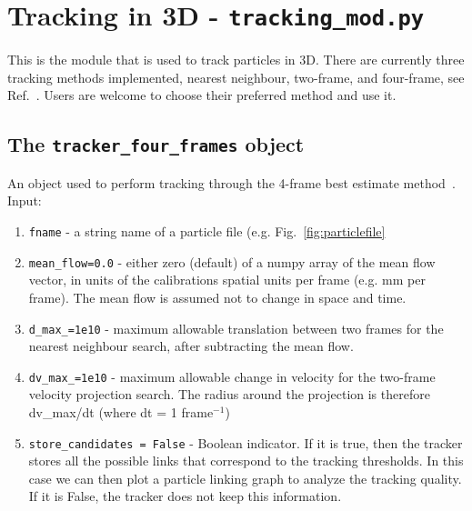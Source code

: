 \documentclass[10pt,a4paper]{article}
\begin{document}
\section{Tracking in 3D - \texttt{tracking\_mod.py}}

This is the module that is used to track particles in 3D. There are currently three tracking methods implemented, nearest neighbour, two-frame, and four-frame, see Ref.~\cite{Ouellette2006}. Users are welcome to choose their preferred method and use it.



\subsection{The \texttt{tracker\_four\_frames} object}\label{sec:four_frames}

An object used to perform tracking through the 4-frame best estimate method~\cite{Ouellette2006}. Input:
%
\begin{enumerate}
	\item \texttt{fname} - a string name of a particle file (e.g. Fig.~\ref{fig:particlefile}
	\item \texttt{mean\_flow=0.0} - either zero (default) of a numpy array of the mean flow vector, in units of the calibrations spatial units per frame (e.g. mm per frame). The mean flow is assumed not to change in space and time.
	\item \texttt{d\_max\_=1e10} - maximum allowable translation between two frames for the nearest neighbour search, after subtracting the mean flow. 
	\item \texttt{dv\_max\_=1e10} - maximum allowable change in velocity for the two-frame velocity projection search. The radius around the projection is therefore dv\_max/dt (where dt = 1 frame$^{-1}$)
	\item \texttt{store\_candidates = False} - Boolean indicator. If it is true, then the tracker stores all the possible links that correspond to the tracking thresholds. In this case we can then plot a particle linking graph to analyze the tracking quality. If it is False, the tracker does not keep this information.  
\end{enumerate}
\end{document}
